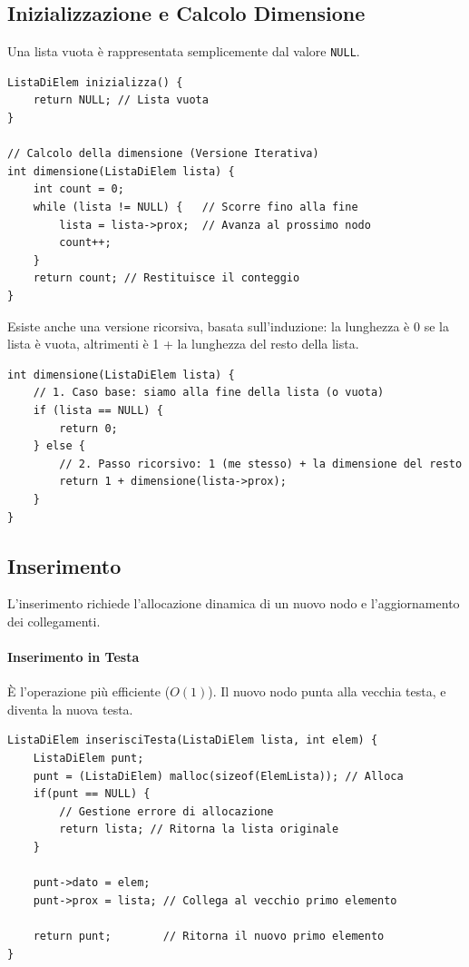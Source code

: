 \documentclass[oneside]{scrbook}
\begin{document}
\subsection{Inizializzazione e Calcolo Dimensione}

Una lista vuota è rappresentata semplicemente dal valore \texttt{NULL}.

\begin{lstlisting}[style=cstyle]
ListaDiElem inizializza() {
    return NULL; // Lista vuota
}

// Calcolo della dimensione (Versione Iterativa)
int dimensione(ListaDiElem lista) {
    int count = 0;
    while (lista != NULL) {   // Scorre fino alla fine
        lista = lista->prox;  // Avanza al prossimo nodo
        count++;
    }
    return count; // Restituisce il conteggio
}
\end{lstlisting}

Esiste anche una versione ricorsiva, basata sull'induzione: la lunghezza è 0 se la lista è vuota, altrimenti è 1 + la lunghezza del resto della lista.

\begin{lstlisting}[style=cstyle]
int dimensione(ListaDiElem lista) {
    // 1. Caso base: siamo alla fine della lista (o vuota)
    if (lista == NULL) {
        return 0;
    } else {
        // 2. Passo ricorsivo: 1 (me stesso) + la dimensione del resto
        return 1 + dimensione(lista->prox);
    }
}
\end{lstlisting}

\subsection{Inserimento}

L'inserimento richiede l'allocazione dinamica di un nuovo nodo e l'aggiornamento dei collegamenti.

\paragraph{Inserimento in Testa}
È l'operazione più efficiente ($O(1)$). Il nuovo nodo punta alla vecchia testa, e diventa la nuova testa.


\begin{lstlisting}[style=cstyle]
ListaDiElem inserisciTesta(ListaDiElem lista, int elem) {
    ListaDiElem punt;
    punt = (ListaDiElem) malloc(sizeof(ElemLista)); // Alloca
    if(punt == NULL) {
        // Gestione errore di allocazione
        return lista; // Ritorna la lista originale
    }

    punt->dato = elem;
    punt->prox = lista; // Collega al vecchio primo elemento
    
    return punt;        // Ritorna il nuovo primo elemento
}
\end{lstlisting}
\end{document}
